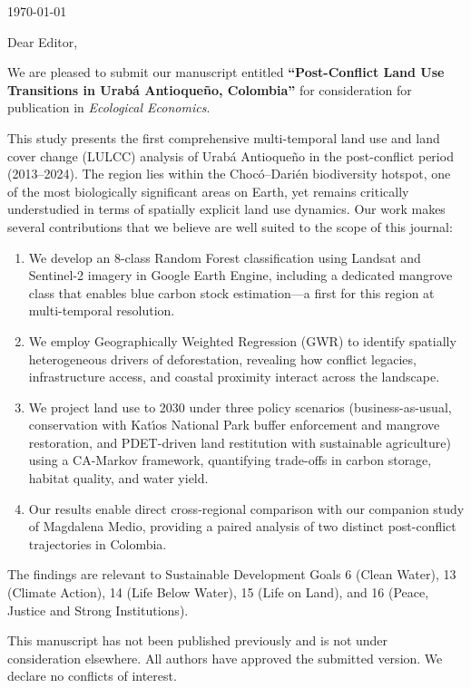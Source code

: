 \documentclass[12pt]{article}
\begin{document}
\noindent
\today

\bigskip\bigskip

\noindent
Dear Editor,

\bigskip

\noindent
We are pleased to submit our manuscript entitled \textbf{``Post-Conflict Land Use Transitions in Urab\'a Antioque\~no, Colombia''} for consideration for publication in \textit{Ecological Economics}.

This study presents the first comprehensive multi-temporal land use and land cover change (LULCC) analysis of Urab\'a Antioque\~no in the post-conflict period (2013--2024). The region lies within the Choc\'o--Dari\'en biodiversity hotspot, one of the most biologically significant areas on Earth, yet remains critically understudied in terms of spatially explicit land use dynamics. Our work makes several contributions that we believe are well suited to the scope of this journal:

\begin{enumerate}
    \item We develop an 8-class Random Forest classification using Landsat and Sentinel-2 imagery in Google Earth Engine, including a dedicated mangrove class that enables blue carbon stock estimation---a first for this region at multi-temporal resolution.
    \item We employ Geographically Weighted Regression (GWR) to identify spatially heterogeneous drivers of deforestation, revealing how conflict legacies, infrastructure access, and coastal proximity interact across the landscape.
    \item We project land use to 2030 under three policy scenarios (business-as-usual, conservation with Kat\'{\i}os National Park buffer enforcement and mangrove restoration, and PDET-driven land restitution with sustainable agriculture) using a CA-Markov framework, quantifying trade-offs in carbon storage, habitat quality, and water yield.
    \item Our results enable direct cross-regional comparison with our companion study of Magdalena Medio, providing a paired analysis of two distinct post-conflict trajectories in Colombia.
\end{enumerate}

The findings are relevant to Sustainable Development Goals 6 (Clean Water), 13 (Climate Action), 14 (Life Below Water), 15 (Life on Land), and 16 (Peace, Justice and Strong Institutions).

This manuscript has not been published previously and is not under consideration elsewhere. All authors have approved the submitted version. We declare no conflicts of interest.
\end{document}

